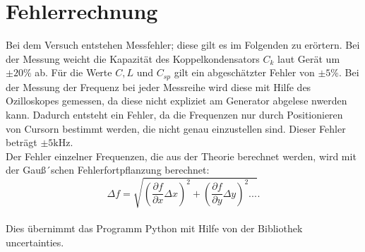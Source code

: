 \section{Fehlerrechnung}
 \label{fehlerrechnung}
Bei dem Versuch entstehen Messfehler;
diese gilt es im Folgenden zu erörtern.
Bei der Messung weicht die Kapazität des Koppelkondensators $C_k$ laut Gerät um $\pm 20 \%$ ab. Für die Werte $C,L $ und $C_{sp}$ gilt
ein abgeschätzter Fehler von $ \pm 5 \% $.
Bei der Messung der Frequenz bei jeder Messreihe
wird diese mit Hilfe des Ozilloskopes gemessen,
da diese nicht expliziet am Generator abgelese nwerden kann.
Dadurch entsteht ein Fehler, da die Frequenzen
nur durch Positionieren von Cursorn bestimmt werden,
die nicht genau einzustellen sind. Dieser Fehler beträgt $\pm 5 \si{\kilo\hertz}$.
\\
Der Fehler einzelner Frequenzen, die aus der Theorie berechnet werden, wird mit der Gauß´schen Fehlerfortpflanzung
berechnet:
\begin{equation}
\Delta f= \sqrt{\left(\frac{\partial f}{\partial x}\Delta x \right)^{2} + \left( \frac{\partial f}{\partial y}\Delta y\right)^2...}\label{eqn:gaus}.
\end{equation}
\\
Dies übernimmt das Programm Python mit Hilfe von der Bibliothek uncertainties.
